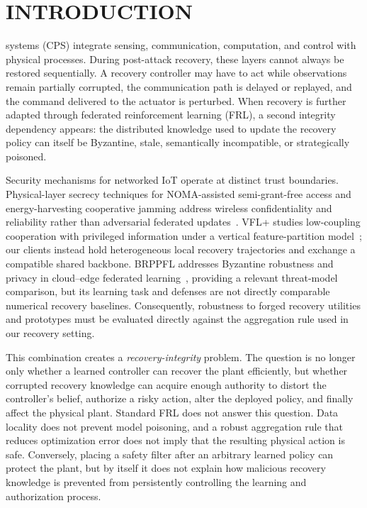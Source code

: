 \section{INTRODUCTION}
 systems (CPS) integrate sensing, communication, computation, and control with physical processes. During post-attack recovery, these layers cannot always be restored sequentially. A recovery controller may have to act while observations remain partially corrupted, the communication path is delayed or replayed, and the command delivered to the actuator is perturbed. When recovery is further adapted through federated reinforcement learning (FRL), a second integrity dependency appears: the distributed knowledge used to update the recovery policy can itself be Byzantine, stale, semantically incompatible, or strategically poisoned.

Security mechanisms for networked IoT operate at distinct trust boundaries. Physical-layer secrecy techniques for NOMA-assisted semi-grant-free access and energy-harvesting cooperative jamming address wireless confidentiality and reliability rather than adversarial federated updates~\cite{Cao2022IoTSGFNOMA,Cao2021UplinkNOMAJammer}. VFL+ studies low-coupling cooperation with privileged information under a vertical feature-partition model~\cite{Dai2025VFLPlus}; our clients instead hold heterogeneous local recovery trajectories and exchange a compatible shared backbone. BRPPFL addresses Byzantine robustness and privacy in cloud--edge federated learning~\cite{Zhang2026BRPPFL}, providing a relevant threat-model comparison, but its learning task and defenses are not directly comparable numerical recovery baselines. Consequently, robustness to forged recovery utilities and prototypes must be evaluated directly against the aggregation rule used in our recovery setting.

This combination creates a \emph{recovery-integrity} problem. The question is no longer only whether a learned controller can recover the plant efficiently, but whether corrupted recovery knowledge can acquire enough authority to distort the controller's belief, authorize a risky action, alter the deployed policy, and finally affect the physical plant. Standard FRL does not answer this question. Data locality does not prevent model poisoning, and a robust aggregation rule that reduces optimization error does not imply that the resulting physical action is safe. Conversely, placing a safety filter after an arbitrary learned policy can protect the plant, but by itself it does not explain how malicious recovery knowledge is prevented from persistently controlling the learning and authorization process.


